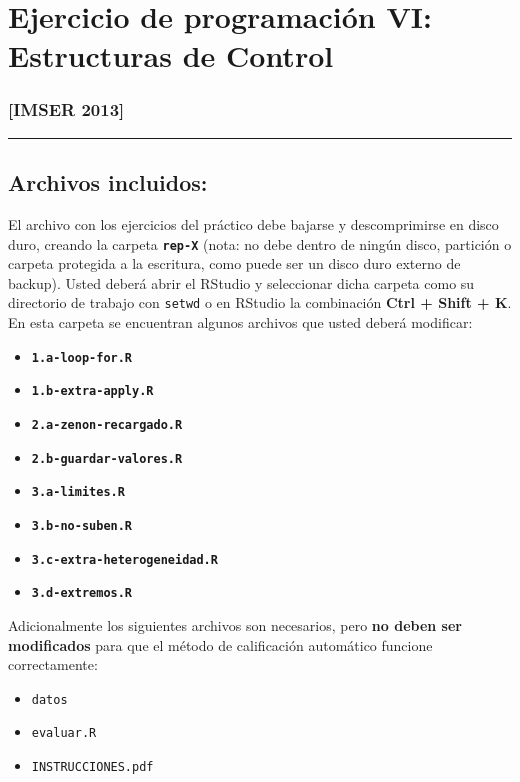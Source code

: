 \documentclass[]{article}
\begin{document}
\section{Ejercicio de programación VI: Estructuras de Control}

\subsubsection{{[}IMSER 2013{]}}

\begin{center}\rule{3in}{0.4pt}\end{center}

\subsection{Archivos incluidos:}

El archivo con los ejercicios del práctico debe bajarse y descomprimirse
en disco duro, creando la carpeta \textbf{\texttt{rep-X}} (nota: no debe
dentro de ningún disco, partición o carpeta protegida a la escritura,
como puede ser un disco duro externo de backup). Usted deberá abrir el
RStudio y seleccionar dicha carpeta como su directorio de trabajo con
\texttt{setwd} o en RStudio la combinación \textbf{Ctrl + Shift + K}. En
esta carpeta se encuentran algunos archivos que usted deberá modificar:

\begin{itemize}
\item
  \textbf{\texttt{1.a-loop-for.R}}
\item
  \textbf{\texttt{1.b-extra-apply.R}}
\item
  \textbf{\texttt{2.a-zenon-recargado.R}}
\item
  \textbf{\texttt{2.b-guardar-valores.R}}
\item
  \textbf{\texttt{3.a-limites.R}}
\item
  \textbf{\texttt{3.b-no-suben.R}}
\item
  \textbf{\texttt{3.c-extra-heterogeneidad.R}}
\item
  \textbf{\texttt{3.d-extremos.R}}
\end{itemize}
Adicionalmente los siguientes archivos son necesarios, pero \textbf{no
deben ser modificados} para que el método de calificación automático
funcione correctamente:

\begin{itemize}
\item
  \texttt{datos}
\item
  \texttt{evaluar.R}
\item
  \texttt{INSTRUCCIONES.pdf}
\end{itemize}
\end{document}
